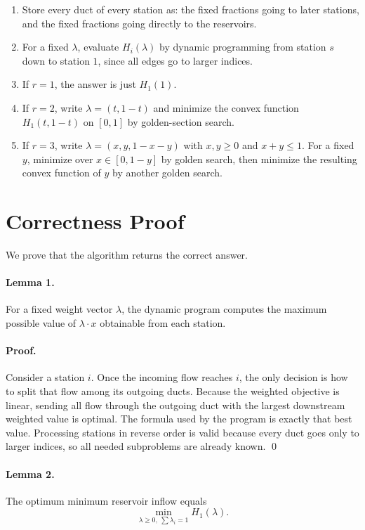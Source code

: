 \documentclass[11pt]{article}
\begin{document}
\begin{enumerate}[leftmargin=*]
    \item Store every duct of every station as:
    the fixed fractions going to later stations, and the fixed fractions going directly to the reservoirs.
    \item For a fixed $\lambda$, evaluate $H_i(\lambda)$ by dynamic programming from station $s$ down to
    station $1$, since all edges go to larger indices.
    \item If $r=1$, the answer is just $H_1(1)$.
    \item If $r=2$, write $\lambda=(t,1-t)$ and minimize the convex function $H_1(t,1-t)$ on $[0,1]$ by
    golden-section search.
    \item If $r=3$, write $\lambda=(x,y,1-x-y)$ with $x,y \ge 0$ and $x+y \le 1$.
    For a fixed $y$, minimize over $x \in [0,1-y]$ by golden search, then minimize the resulting convex
    function of $y$ by another golden search.
\end{enumerate}

\section*{Correctness Proof}

We prove that the algorithm returns the correct answer.

\paragraph{Lemma 1.}
For a fixed weight vector $\lambda$, the dynamic program computes the maximum possible value of
$\lambda \cdot x$ obtainable from each station.

\paragraph{Proof.}
Consider a station $i$. Once the incoming flow reaches $i$, the only decision is how to split that flow
among its outgoing ducts. Because the weighted objective is linear, sending all flow through the outgoing
duct with the largest downstream weighted value is optimal. The formula used by the program is exactly
that best value. Processing stations in reverse order is valid because every duct goes only to larger
indices, so all needed subproblems are already known. \qed

\paragraph{Lemma 2.}
The optimum minimum reservoir inflow equals
\[
\min_{\lambda \ge 0,\ \sum \lambda_i=1} H_1(\lambda).
\]
\end{document}

